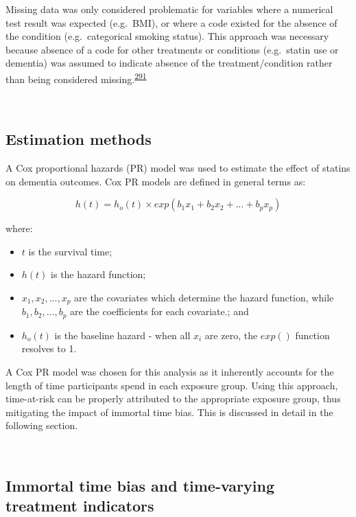 \documentclass[a4paper, twoside]{templates/ociamthesis}
\providecommand{\tightlist}{%
  \setlength{\itemsep}{0pt}\setlength{\parskip}{0pt}}
\begin{document}
Missing data was only considered problematic for variables where a numerical test result was expected (e.g.~BMI), or where a code existed for the absence of the condition (e.g.~categorical smoking status). This approach was necessary because absence of a code for other treatments or conditions (e.g.~statin use or dementia) was assumed to indicate absence of the treatment/condition rather than being considered missing.\textsuperscript{\protect\hyperlink{ref-wells2013strategies}{291}}

~

\hypertarget{estimation-methods}{%
\subsection{Estimation methods}\label{estimation-methods}}

A Cox proportional hazards (PR) model was used to estimate the effect of statins on dementia outcomes. Cox PR models are defined in general terms as:

\begin{equation}
  h(t) = h_o(t) \times exp(b_1x_1 + b_2x_2 + ... +b_px_p)
  \label{eq:cox-model}
\end{equation}

where:

\begin{itemize}
\tightlist
\item
  \(t\) is the survival time;
\item
  \(h(t)\) is the hazard function;
\item
  \(x_1,x_2,...,x_p\) are the covariates which determine the hazard function, while \(b_1,b_2,...,b_p\) are the coefficients for each covariate.; and
\item
  \(h_o(t)\) is the baseline hazard - when all \(x_i\) are zero, the \(exp()\) function resolves to 1.
\end{itemize}

A Cox PR model was chosen for this analysis as it inherently accounts for the length of time participants spend in each exposure group. Using this approach, time-at-risk can be properly attributed to the appropriate exposure group, thus mitigating the impact of immortal time bias. This is discussed in detail in the following section.

~

\hypertarget{cprd-immortal-time-bias}{%
\subsection{Immortal time bias and time-varying treatment indicators}\label{cprd-immortal-time-bias}}
\end{document}
